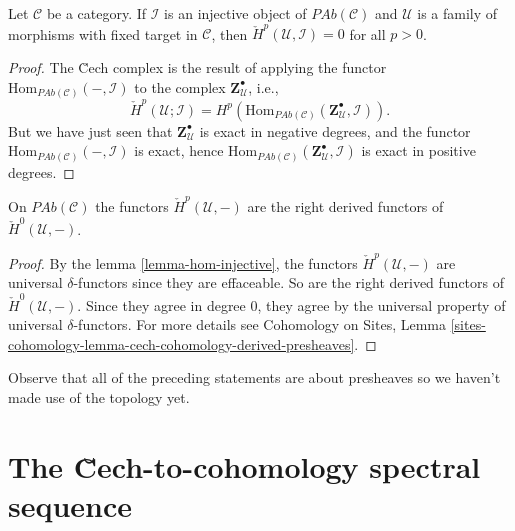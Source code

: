 \begin{lemma}
\label{lemma-hom-injective}
Let $\mathcal{C}$ be a category. If $\mathcal{I}$ is an injective object of
$\textit{PAb}(\mathcal{C})$ and $\mathcal{U}$ is a family of morphisms with
fixed target in $\mathcal{C}$, then $\check H^p(\mathcal{U}, \mathcal{I}) = 0$
for all $p>0$.
\end{lemma}

\begin{proof}
The \u Cech complex is the result of applying the functor
$\text{Hom}_{\textit{PAb}(\mathcal{C})}(-, \mathcal{I}) $ to the complex $
\mathbf{Z}^\bullet_\mathcal{U} $, i.e.,
$$
\check H^p(\mathcal{U} ; \mathcal{I}) = H^p
(\text{Hom}_{\textit{PAb}(\mathcal{C})} (\mathbf{Z}^\bullet_\mathcal{U},
\mathcal{I})).
$$
But we have just seen that $\mathbf{Z}^\bullet_\mathcal{U}$ is exact in
negative degrees, and the functor $\text{Hom}_{\textit{PAb}(\mathcal{C})}(-,
\mathcal{I})$ is exact, hence $\text{Hom}_{\textit{PAb}(\mathcal{C})}
(\mathbf{Z}^\bullet_\mathcal{U}, \mathcal{I})$ is exact in positive degrees.
\end{proof}

\begin{theorem}
\label{theorem-cech-derived}
On $\textit{PAb}(\mathcal{C})$ the functors $\check{H}^p(\mathcal{U}, -)$ are
the right derived functors of $\check{H}^0(\mathcal{U}, -)$.
\end{theorem}

\begin{proof}
By the lemma \ref{lemma-hom-injective}, the functors $\check
H^p(\mathcal{U}, -)$ are universal $\delta$-functors since they are effaceable.
So are the right derived functors of $\check H^0(\mathcal{U}, -)$. Since they
agree in degree $0$, they agree by the universal property of universal
$\delta$-functors. For more details see
Cohomology on Sites,
Lemma \ref{sites-cohomology-lemma-cech-cohomology-derived-presheaves}. 
\end{proof}

\begin{remark}
\label{remark-presheaves-no-topology}
Observe that all of the preceding statements are about presheaves so we haven't
made use of the topology yet.
\end{remark}




\section{The \u Cech-to-cohomology spectral sequence}
\label{section-cech-ss}

